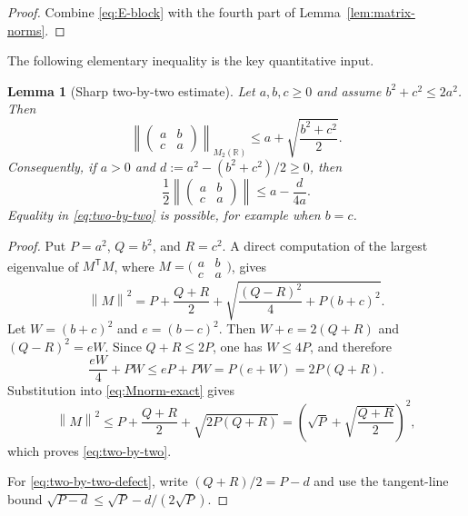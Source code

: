 \documentclass[11pt]{amsart}
\numberwithin{equation}{section}
\newtheorem{lemma}[lemma]{Lemma}
\theoremstyle{remark}
\newcommand{\norm}[1]{\left\lVert #1\right\rVert}
\begin{document}
\begin{proof}
Combine \eqref{eq:E-block} with the fourth part of
Lemma~\ref{lem:matrix-norms}.
\end{proof}

The following elementary inequality is the key quantitative input.

\begin{lemma}[Sharp two-by-two estimate]\label{lem:two-by-two}
Let $a,b,c\geq0$ and assume $b^2+c^2\leq2a^2$.  Then
\begin{equation}\label{eq:two-by-two}
 \norm{
 \begin{pmatrix}a&b\\c&a\end{pmatrix}}_{M_2(\mathbb R)}
 \leq a+\sqrt{\frac{b^2+c^2}{2}}.
\end{equation}
Consequently, if $a>0$ and
$d:=a^2-(b^2+c^2)/2\geq0$, then
\begin{equation}\label{eq:two-by-two-defect}
 \frac12\norm{
 \begin{pmatrix}a&b\\c&a\end{pmatrix}}
 \leq a-\frac d{4a}.
\end{equation}
Equality in \eqref{eq:two-by-two} is possible, for example when $b=c$.
\end{lemma}

\begin{proof}
Put $P=a^2$, $Q=b^2$, and $R=c^2$.  A direct computation of the largest
eigenvalue of $M^{\mathsf T}M$, where
$M=\bigl(\begin{smallmatrix}a&b\\c&a\end{smallmatrix}\bigr)$, gives
\begin{equation}\label{eq:Mnorm-exact}
 \norm M^2
 =P+\frac{Q+R}{2}
 +\sqrt{\frac{(Q-R)^2}{4}+P(b+c)^2}.
\end{equation}
Let $W=(b+c)^2$ and $e=(b-c)^2$.  Then
$W+e=2(Q+R)$ and $(Q-R)^2=eW$.  Since $Q+R\leq2P$, one has
$W\leq4P$, and therefore
\[
 \frac{eW}{4}+PW\leq eP+PW=P(e+W)=2P(Q+R).
\]
Substitution into \eqref{eq:Mnorm-exact} gives
\[
 \norm M^2
 \leq P+\frac{Q+R}{2}+\sqrt{2P(Q+R)}
 =\left(\sqrt P+\sqrt{\frac{Q+R}{2}}\right)^2,
\]
which proves \eqref{eq:two-by-two}.

For \eqref{eq:two-by-two-defect}, write
$(Q+R)/2=P-d$ and use the tangent-line bound
$\sqrt{P-d}\leq\sqrt P-d/(2\sqrt P)$.
\end{proof}
\end{document}
